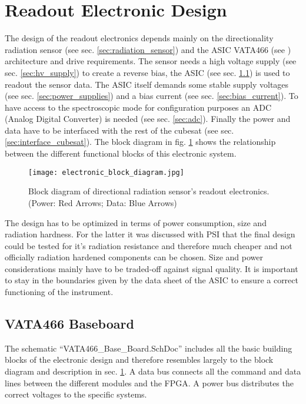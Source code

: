 \section{Readout Electronic Design}
\label{sec:electronic_design}
The design of the readout electronics depends mainly on the directionality radiation sensor (see sec. \ref{sec:radiation_sensor}) and the ASIC VATA466 (see \cite{Meier2016VATA466}) architecture and drive requirements.
The sensor needs a high voltage supply (see sec. \ref{sec:hv_supply}) to create a reverse bias, the ASIC (see sec. \ref{sec:vata466_baseboard}) is used to readout the sensor data.
The ASIC itself demands some stable supply voltages (see sec. \ref{sec:power_supplies}) and a bias current (see sec. \ref{sec:bias_current}).
To have access to the spectroscopic mode for configuration purposes an ADC (Analog Digital Converter) is needed (see sec. \ref{sec:adc}).
Finally the power and data have to be interfaced with the rest of the cubesat (see sec. \ref{sec:interface_cubesat}).
The block diagram in fig. \ref{fig:electronic_block_diagram} shows the relationship between the different functional blocks of this electronic system.
\begin{figure}[H]
    \centering
    \texttt{[image: electronic\_block\_diagram.jpg]}
    \caption[Block Diagram Readout Electronics]{Block diagram of directional radiation sensor's readout electronics. \\    (Power: Red Arrows; Data: Blue Arrows)}
    \label{fig:electronic_block_diagram}
\end{figure}

The design has to be optimized in terms of power consumption, size and radiation hardness. 
For the latter it was discussed with PSI that the final design could be tested for it's radiation resistance and therefore much cheaper and not officially radiation hardened components can be chosen.
Size and power considerations mainly have to be traded-off against signal quality.
%
It is important to stay in the boundaries given by the data sheet of the ASIC to ensure a correct functioning of the instrument.


\subsection{VATA466 Baseboard}
\label{sec:vata466_baseboard}
The schematic ``VATA466\_Base\_Board.SchDoc'' includes all the basic building blocks of the electronic design and therefore resembles largely to the block diagram and description in sec. \ref{sec:electronic_design}.
A data bus connects all the command and data lines between the different modules and the FPGA.
A power bus distributes the correct voltages to the specific systems.

